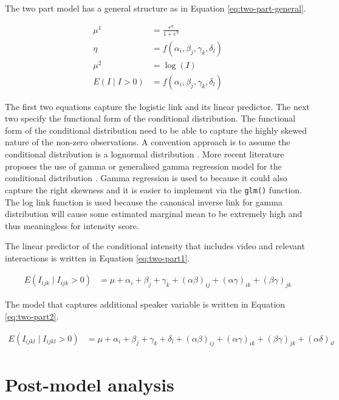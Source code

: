 \documentclass{monashthesis}
\begin{document}
The two part model has a general structure as in Equation \ref{eq:two-part-general}.

\begin{align}\label{eq:two-part-general}
\mu^1 &= \frac{e^{\eta}}{1 + e^{\eta}} \\
\eta &= f(\alpha_i, \beta_j, \gamma_k, \delta_l) \\
\mu^2 &= \log(I) \\
E(I \mid I > 0) &= f(\alpha_i, \beta_j, \gamma_k, \delta_l)
\end{align}

\noindent The first two equations capture the logistic link and its linear predictor. The next two specify the functional form of the conditional distribution. The functional form of the conditional distribution need to be able to capture the highly skewed nature of the non-zero observations. A convention approach is to assume the conditional distribution is a lognormal distribution \autocites{manning1981two}{diehr1999methods}. More recent literature proposes the use of gamma or generalised gamma regression model for the conditional distribution \autocite{twopart2010}. Gamma regression is used to because it could also capture the right skewness and it is easier to implement via the \texttt{glm()} function. The log link function is used because the canonical inverse link for gamma distribution will cause some estimated marginal mean to be extremely high and thus meaningless for intensity score.

The linear predictor of the conditional intensity that includes video and relevant interactions is written in Equation \ref{eq:two-part1}.

\begin{align}\label{eq:two-part1}
E(I_{ijk} \mid I_{ijk} > 0) &= \mu + \alpha_i + \beta_j +\gamma_k + (\alpha\beta)_{ij} + (\alpha\gamma)_{ik} + (\beta\gamma)_{jk}
\end{align}

The model that captures additional speaker variable is written in Equation \ref{eq:two-part2}.

\begin{align}\label{eq:two-part2}
E(I_{ijkl} \mid I_{ijkl} > 0) &= \mu + \alpha_i + \beta_j +\gamma_k + \delta_l + (\alpha\beta)_{ij} + (\alpha\gamma)_{ik} + (\beta\gamma)_{jk} + (\alpha\delta)_{il}
\end{align}

\hypertarget{post-model-analysis}{%
\section{Post-model analysis}\label{post-model-analysis}}
\end{document}
